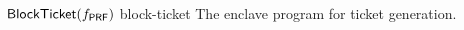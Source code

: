 \begin{cccProgram}
    {$\mathsf{BlockTicket}(f_\mathsf{PRF})$}
    {block-ticket}
	{The enclave program for ticket generation.}

    \begin{algorithmic}[1]
        
        
    \end{algorithmic}
\end{cccProgram}